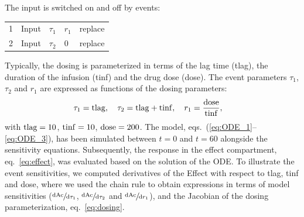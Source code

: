 \documentclass[journal, a4paper]{IEEEtran}
\begin{document}
The input is switched on and off by events:
\begin{center}
\begin{tabular}{|r|l|l|l|l|}\hline
     1 & Input & $\tau_1$ & $r_1$ & replace \\
     2 & Input & $\tau_2$ & 0 & replace\\
     \hline
\end{tabular}
\end{center}
Typically, the dosing is parameterized in terms of the lag time (tlag), the duration of the infusion (tinf) and the drug dose (dose). The event parameters $\tau_1$, $\tau_2$ and $r_1$ are expressed as functions of the dosing parameters:
\begin{align}
    \tau_1 = {\rm tlag},\quad \tau_2 = {\rm tlag} + {\rm tinf},\quad r_1 &= \frac{\rm dose}{\rm tinf},\label{eq:dosing}
\end{align}
with ${\rm tlag} = 10$, ${\rm tinf} = 10$, ${\rm dose} = 200$. The model, eqs.~(\ref{eq:ODE_1}--\ref{eq:ODE_3}), has been simulated between $t = 0$ and $t = 60$ alongside the sensitivity equations. Subsequently, the response in the effect compartment, eq.~\eqref{eq:effect}, was evaluated based on the solution of the ODE. To illustrate the event sensitivities, we computed derivatives of the Effect with respect to tlag, tinf and dose, where we used the chain rule to obtain expressions in terms of model sensitivities ($\sfrac{\rm dAc}{\rm d \tau_1}$, $\sfrac{\rm dAc}{\rm d \tau_2}$ and $\sfrac{\rm dAc}{{\rm d} r_1}$), and the Jacobian of the dosing parameterization, eq.~\eqref{eq:dosing}.
\end{document}

